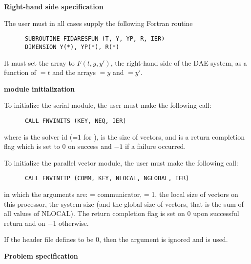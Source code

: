 \begin{Steps}
  
\item {\bf Right-hand side specification}
  
  The user must in all cases supply the following Fortran routine
\begin{verbatim}
      SUBROUTINE FIDARESFUN (T, Y, YP, R, IER)
      DIMENSION Y(*), YP(*), R(*)
\end{verbatim}
  It must set the  array to $F(t,y,y')$, the right-hand side of the DAE
  system, as a function of $=t$ and the arrays $=y$ and $=y'$.
  
\item  {\bf {\nvector} module initialization}

  {\s} To initialize the serial {\nvector} module, the user must make the
  following call:
\begin{verbatim}
      CALL FNVINITS (KEY, NEQ, IER)
\end{verbatim}
  where 
   is the solver id (=1 for {\ida}),
   is the size of vectors, and
   is a  return completion flag which is set to $0$ on success and $-1$ 
  if a failure occurred.
  
  {\p} To initialize the parallel vector module, the user must make the
  following call:
\begin{verbatim}
      CALL FNVINITP (COMM, KEY, NLOCAL, NGLOBAL, IER)
\end{verbatim}
  in which the arguments are:  = {\mpi} communicator,  = 1,  the local size of vectors on this
  processor,  the system size (and the global size of vectors, that
  is the sum of all values of NLOCAL). The return completion flag  is
  set on $0$ upon successful return and on $-1$ otherwise.

  {\warn} If the header file  defines  to be $0$, then the argument
   is ignored and  is used.
  
\item {\bf Problem specification}


\end{Steps}
